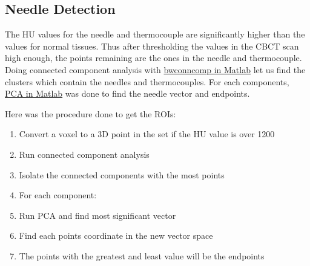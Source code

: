 \documentclass[]{spie}  %
\begin{document}
\subsection{Needle Detection}

The HU values for the needle and thermocouple are significantly higher than the values for normal tissues. Thus after thresholding the values in the CBCT scan high enough, the points remaining are the ones in the needle and thermocouple. Doing connected component analysis with \href{http://www.mathworks.com/help/images/ref/bwconncomp.html}{bwconncomp in Matlab} \cite{bwconncomp} let us find the clusters which contain the needles and thermocouples. For each components, \href{http://www.mathworks.com/help/stats/pca.html}{PCA in Matlab} \cite{pca} was done to find the needle vector and endpoints. 

Here was the procedure done to get the ROIs:
\begin{enumerate}
\item Convert a voxel to a 3D point in the set if the HU value is over 1200
\item Run connected component analysis
\item Isolate the connected components with the most points
\item For each component:
\item Run PCA and find most significant vector
\item Find each points coordinate in the new vector space
\item The points with the greatest and least value will be the endpoints
\end{enumerate}
\end{document}
